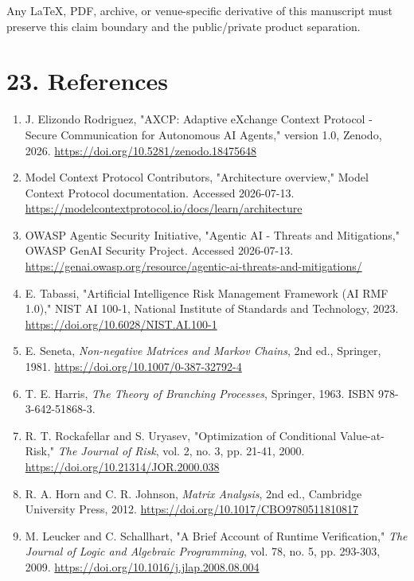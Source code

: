 \documentclass[
  american,
  a4paper,
  10pt]{article}
\providecommand{\tightlist}{%
  \setlength{\itemsep}{0pt}\setlength{\parskip}{0pt}}
\begin{document}
Any LaTeX, PDF, archive, or venue-specific derivative of this manuscript must preserve
this claim boundary and the public/private product separation.

\clearpage
\section{23. References}\label{23-references}

\begin{enumerate}
\def\labelenumi{\arabic{enumi}.}
\tightlist
\item
  J. Elizondo Rodriguez, "AXCP: Adaptive eXchange Context Protocol - Secure
  Communication for Autonomous AI Agents," version 1.0, Zenodo, 2026.
  \url{https://doi.org/10.5281/zenodo.18475648}
\item
  Model Context Protocol Contributors, "Architecture overview," Model Context Protocol
  documentation. Accessed 2026-07-13.
  \url{https://modelcontextprotocol.io/docs/learn/architecture}
\item
  OWASP Agentic Security Initiative, "Agentic AI - Threats and Mitigations," OWASP GenAI
  Security Project. Accessed 2026-07-13.
  \url{https://genai.owasp.org/resource/agentic-ai-threats-and-mitigations/}
\item
  E. Tabassi, "Artificial Intelligence Risk Management Framework (AI RMF 1.0)," NIST AI
  100-1, National Institute of Standards and Technology, 2023.
  \url{https://doi.org/10.6028/NIST.AI.100-1}
\item
  E. Seneta, \emph{Non-negative Matrices and Markov Chains}, 2nd ed., Springer, 1981.
  \url{https://doi.org/10.1007/0-387-32792-4}
\item
  T. E. Harris, \emph{The Theory of Branching Processes}, Springer, 1963. ISBN
  978-3-642-51868-3.
\item
  R. T. Rockafellar and S. Uryasev, "Optimization of Conditional Value-at-Risk,"
  \emph{The Journal of Risk}, vol. 2, no. 3, pp. 21-41, 2000.
  \url{https://doi.org/10.21314/JOR.2000.038}
\item
  R. A. Horn and C. R. Johnson, \emph{Matrix Analysis}, 2nd ed., Cambridge University
  Press, 2012. \url{https://doi.org/10.1017/CBO9780511810817}
\item
  M. Leucker and C. Schallhart, "A Brief Account of Runtime Verification," \emph{The
  Journal of Logic and Algebraic Programming}, vol. 78, no. 5, pp. 293-303, 2009.
  \url{https://doi.org/10.1016/j.jlap.2008.08.004}
\end{enumerate}
\end{document}
